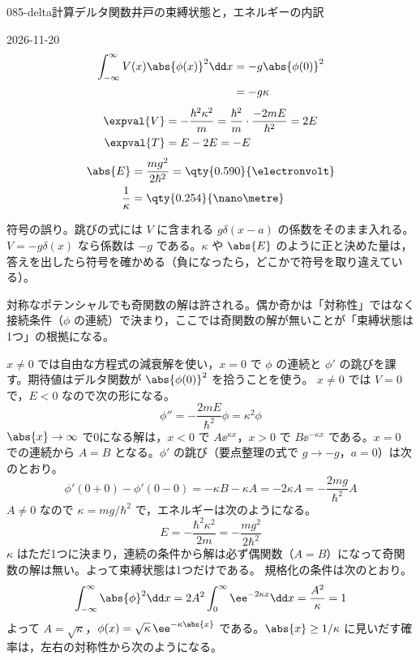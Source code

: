 \documentclass[uplatex,dvipdfmx,a4paper,11pt]{jsarticle}
\begin{document}
\begin{mondai}{085-delta}{計算}{デルタ関数井戸の束縛状態と，エネルギーの内訳}
\begin{kotaeutsushi}{2026-11-20}
\begin{align*}
\int_{-\infty}^{\infty}V(x)\abs{\phi(x)}^{2}\dd x&=-g\abs{\phi(0)}^{2}\\
&=-g\kappa
\end{align*}
\begin{align*}
\expval{V}&=-\frac{\hbar^{2}\kappa^{2}}{m}=\frac{\hbar^{2}}{m}\cdot\frac{-2mE}{\hbar^{2}}=2E\\
\expval{T}&=E-2E=-E
\end{align*}
\begin{align*}
\abs{E}&=\frac{mg^{2}}{2\hbar^{2}}=\qty{0.590}{\electronvolt}\\
\frac{1}{\kappa}&=\qty{0.254}{\nano\metre}
\end{align*}
\end{kotaeutsushi}
\begin{kizuki}
\item {} 符号の誤り。跳びの式には $V$ に含まれる $g\delta(x-a)$ の係数をそのまま入れる。$V=-g\delta(x)$ なら係数は $-g$ である。$\kappa$ や $\abs{E}$ のように正と決めた量は，答えを出したら符号を確かめる（負になったら，どこかで符号を取り違えている）。
\item 対称なポテンシャルでも奇関数の解は許される。偶か奇かは「対称性」ではなく接続条件（$\phi$ の連続）で決まり，ここでは奇関数の解が無いことが「束縛状態は1つ」の根拠になる。
\end{kizuki}
\begin{tadashii}
\houshin $x\ne 0$ では自由な方程式の減衰解を使い，$x=0$ で $\phi$ の連続と $\phi'$ の跳びを課す。期待値はデルタ関数が $\abs{\phi(0)}^{2}$ を拾うことを使う。
\keisan
{} $x\ne 0$ では $V=0$ で，$E<0$ なので次の形になる。
\[ \phi''=-\frac{2mE}{\hbar^{2}}\phi=\kappa^{2}\phi \]
$\abs{x}\to\infty$ で0になる解は，$x<0$ で $A\ee^{\kappa x}$，$x>0$ で $B\ee^{-\kappa x}$ である。$x=0$ での連続から $A=B$ となる。$\phi'$ の跳び（要点整理の式で $g\to-g$，$a=0$）は次のとおり。
\[ \phi'(0+0)-\phi'(0-0)=-\kappa B-\kappa A=-2\kappa A=-\frac{2mg}{\hbar^{2}}A \]
$A\ne 0$ なので $\kappa=mg/\hbar^{2}$ で，エネルギーは次のようになる。
\[ E=-\frac{\hbar^{2}\kappa^{2}}{2m}=-\frac{mg^{2}}{2\hbar^{2}} \]
$\kappa$ はただ1つに決まり，連続の条件から解は必ず偶関数（$A=B$）になって奇関数の解は無い。よって束縛状態は1つだけである。
 規格化の条件は次のとおり。
\[ \int_{-\infty}^{\infty}\abs{\phi}^{2}\dd x=2A^{2}\int_{0}^{\infty}\ee^{-2\kappa x}\dd x=\frac{A^{2}}{\kappa}=1 \]
よって $A=\sqrt{\kappa}$，$\phi(x)=\sqrt{\kappa}\,\ee^{-\kappa\abs{x}}$ である。$\abs{x}\ge 1/\kappa$ に見いだす確率は，左右の対称性から次のようになる。

\end{tadashii}
\end{mondai}
\end{document}
